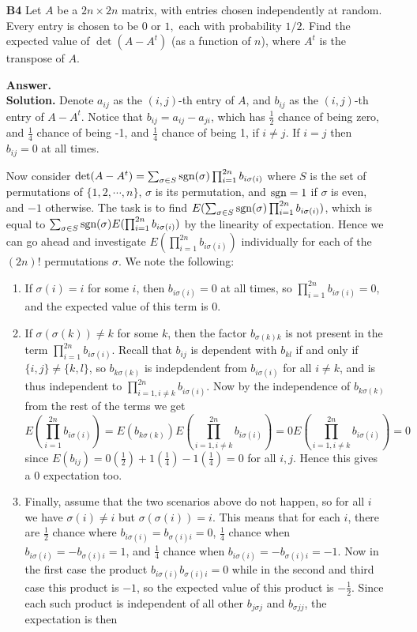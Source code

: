 \documentclass[11pt,a4paper]{article}
\begin{document}
\begin{enumerate}
	\item[\textbf{B4}]Let $A$ be a $2n\times 2n$ matrix, with entries chosen independently at random. Every entry is chosen to be $0$ or $1,$ each with probability $1/2.$ Find the expected value of $\det(A-A^t)$ (as a function of $n$), where $A^t$ is the transpose of $A.$
	
	\textbf{Answer.}\\
	\textbf{Solution.} Denote $a_{ij}$ as the $(i, j)$-th entry of $A$, and $b_{ij}$ as the $(i, j)$-th entry of $A-A^t$. Notice that $b_{ij}=a_{ij}-a_{ji}$, which has $\frac 12$ chance of being zero, and $\frac 14$ chance of being -1, and $\frac 14$ chance of being 1, if $i\neq j$. If $i=j$ then $b_{ij}=0$ at all times. 
	
	Now consider $\det(A-A^t)=\sum_{\sigma\in S}\text{sgn}(\sigma)\prod_{i=1}^{2n}b_{i\sigma(i)}$ where $S$ is the set of permutations of $\{1, 2, \cdots , n\}$, $\sigma$ is its permutation, and $\text{sgn}=1$ if $\sigma$ is even, and $-1$ otherwise. The task is to find $E(\sum_{\sigma\in S}\text{sgn}(\sigma)\prod_{i=1}^{2n}b_{i\sigma(i)})$, whixh is equal to $\sum_{\sigma\in S}\text{sgn}(\sigma)E(\prod_{i=1}^{2n}b_{i\sigma(i)})$ by the linearity of expectation. Hence we can go ahead and investigate $E(\prod_{i=1}^{2n}b_{i\sigma(i)})$ individually for each of the $(2n)!$ permutations $\sigma$. We note the following: 
	\begin{enumerate}
		\item If $\sigma(i)=i$ for some $i$, then $b_{i\sigma(i)}=0$ at all times, so $\prod_{i=1}^{2n}b_{i\sigma(i)}=0$, and the expected value of this term is 0. 
		\item If $\sigma(\sigma(k))\neq k$ for some $k$, then the factor $b_{\sigma(k)k}$ is not present in the term $\prod_{i=1}^{2n}b_{i\sigma(i)}$. Recall that $b_{ij}$ is dependent with $b_{kl}$ if and only if $\{i, j\}\neq \{k, l\}$, so $b_{k\sigma(k)}$ is indepdendent from $b_{i\sigma(i)}$ for all $i\neq k$, and is thus independent to $\prod_{i=1, i\neq k}^{2n}b_{i\sigma(i)}$. 
		Now by the independence of $b_{k\sigma(k)}$ from the rest of the terms we get 
		\[E(\prod_{i=1}^{2n}b_{i\sigma(i)})=E(b_{k\sigma(k)})E(\prod_{i=1, i\neq k}^{2n}b_{i\sigma(i)})
		=0E(\prod_{i=1, i\neq k}^{2n}b_{i\sigma(i)})=0\]
		since $E(b_{ij})=0(\frac 12)+1(\frac 14)-1(\frac 14)=0$ for all $i, j$. Hence this gives a 0 expectation too. 
		\item Finally, assume that the two scenarios above do not happen, so for all $i$ we have $\sigma(i)\neq i$ but $\sigma(\sigma(i))=i$. This means that for each $i$, there are $\frac 12$ chance where $b_{i\sigma(i)}=b_{\sigma(i)i}=0$, $\frac 14$ chance when $b_{i\sigma(i)}=-b_{\sigma(i)i}=1$, and $\frac 14$ chance when $b_{i\sigma(i)}=-b_{\sigma(i){i}}=-1$. Now in the first case the product $b_{i\sigma(i)}b_{\sigma(i)i}=0$ while in the second and third case this product is $-1$, so the expected value of this product is $-\frac 12$. Since each such product is independent of all other $b_{j\sigma{j}}$ and $b_{\sigma{j}j}$, the expectation is then 

\end{enumerate}
\end{enumerate}
\end{document}
